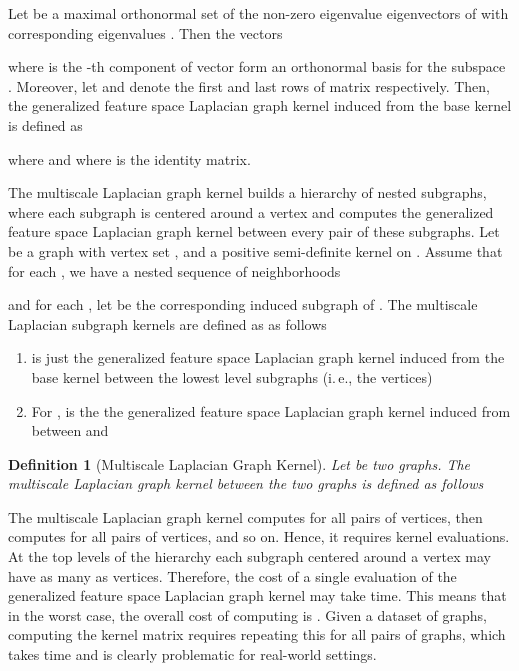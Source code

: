 \documentclass[twoside,11pt]{article}
\newcommand{\ie}{i.\,e., }
\newtheorem{definition}{Definition}
\begin{document}
Let  be a maximal orthonormal set of the non-zero eigenvalue eigenvectors of 
with corresponding eigenvalues .
Then the vectors

where  is the -th component of vector  form an orthonormal basis for the subspace .
Moreover, let  and  denote the first  and last  rows of matrix  respectively.
Then, the generalized feature space Laplacian graph kernel induced from the base kernel  is defined as

where  and  where  is the  identity matrix.

The multiscale Laplacian graph kernel builds a hierarchy of nested subgraphs, where each subgraph is centered around a vertex and computes the generalized feature space Laplacian graph kernel between every pair of these subgraphs.
Let  be a graph with vertex set , and  a positive semi-definite kernel on .
Assume that for each , we have a nested sequence of  neighborhoods

and for each , let  be the corresponding induced subgraph of .
The multiscale Laplacian subgraph kernels are defined as  as follows
\begin{enumerate}
    \item  is just the generalized feature space Laplacian graph kernel  induced from the base kernel  between the lowest level subgraphs (\ie the vertices)
    
    \item For ,  is the the generalized feature space Laplacian graph kernel induced from  between  and 
    
\end{enumerate}

\begin{definition}[Multiscale Laplacian Graph Kernel]
	Let  be two graphs.
	The multiscale Laplacian graph kernel between the two graphs is defined as follows
	
\end{definition}
The multiscale Laplacian graph kernel computes  for all pairs of vertices, then computes  for all pairs of vertices, and so on.
Hence, it requires  kernel evaluations.
At the top levels of the hierarchy each subgraph centered around a vertex  may have as many as  vertices.
Therefore, the cost of a single evaluation of the generalized feature space Laplacian graph kernel may take  time.
This means that in the worst case, the overall cost of computing  is .
Given a dataset of  graphs, computing the kernel matrix requires repeating this for all pairs of graphs, which takes  time and is clearly problematic for real-world settings.
\end{document}
